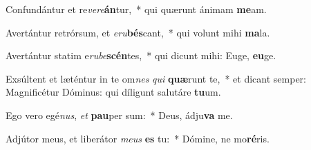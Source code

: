 \item Confundántur et re\textit{ve}\textit{re}\textbf{án}tur,~* qui quærunt ánimam \textbf{me}am.
\item Avertántur retrórsum, et \textit{e}\textit{ru}\textbf{bés}cant,~* qui volunt mihi \textbf{ma}la.
\item Avertántur statim e\textit{ru}\textit{be}\textbf{scén}tes,~* qui dicunt mihi: Euge, \textbf{eu}ge.
\item Exsúltent et læténtur in te om\textit{nes} \textit{qui} \textbf{quæ}runt te,~* et dicant semper: Magnificétur Dóminus: qui díligunt salutáre \textbf{tu}um.
\item Ego vero egé\textit{nus}, \textit{et} \textbf{pau}per sum:~* Deus, ádju\textbf{va} me.
\item Adjútor meus, et liberátor \textit{me}\textit{us} \textbf{es} tu:~* Dómine, ne mo\textbf{ré}ris.
